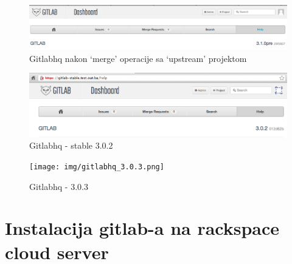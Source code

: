 \documentclass[times, utf8, seminar]{fit}
\begin{document}
\begin{figure}[H]
\centering
\includegraphics[width=15cm]{img/gitlab_hernad_310_after_merge.png}
\caption{Gitlabhq nakon `merge' operacije sa `upstream' projektom}
\end{figure}

\begin{figure}[H]
\centering
\includegraphics[width=15cm]{img/gitlab_stable_3.0.2.png}
\caption{Gitlabhq - stable 3.0.2}
\end{figure}


\begin{figure}[H]
\centering
\texttt{[image: img/gitlabhq\_3.0.3.png]}
\caption{Gitlabhq - 3.0.3}
\end{figure}


\chapter{Instalacija gitlab-a na rackspace cloud server}
\end{document}
